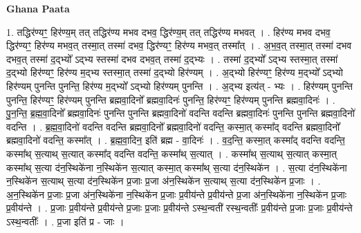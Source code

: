 \documentclass[17pt]{extarticle}
\begin{document}
\textbf{Ghana Paata } \newline

1. तद्धिर॑ण्यꣳ॒॒ हिर॑ण्य॒म् तत् तद्धिर॑ण्य मभव दभव॒ द्धिर॑ण्य॒म् तत् तद्धिर॑ण्य मभवत् । . हिर॑ण्य मभव दभव॒ द्धिर॑ण्यꣳ॒॒ हिर॑ण्य मभव॒त् तस्मा॒त् तस्मा॑ दभव॒ द्धिर॑ण्यꣳ॒॒ हिर॑ण्य मभव॒त् तस्मा᳚त् । . अ॒भ॒व॒त् तस्मा॒त् तस्मा॑ दभव दभव॒त् तस्मा॑ द॒द्भ्यो᳚ ऽद्भ्य स्तस्मा॑ दभव दभव॒त् तस्मा॑ द॒द्भ्यः । . तस्मा॑ द॒द्भ्यो᳚ ऽद्भ्य स्तस्मा॒त् तस्मा॑ द॒द्भ्यो हिर॑ण्यꣳ॒॒ हिर॑ण्य म॒द्भ्य स्तस्मा॒त् तस्मा॑ द॒द्भ्यो हिर॑ण्यम् । . अ॒द्भ्यो हिर॑ण्यꣳ॒॒ हिर॑ण्य म॒द्भ्यो᳚ ऽद्भ्यो हिर॑ण्यम् पुनन्ति पुनन्ति॒ हिर॑ण्य म॒द्भ्यो᳚ ऽद्भ्यो हिर॑ण्यम् पुनन्ति । . अ॒द्भ्य इत्य॑त् - भ्यः । . हिर॑ण्यम् पुनन्ति पुनन्ति॒ हिर॑ण्यꣳ॒॒ हिर॑ण्यम् पुनन्ति ब्रह्मवा॒दिनो᳚ ब्रह्मवा॒दिनः॑ पुनन्ति॒ हिर॑ण्यꣳ॒॒ हिर॑ण्यम् पुनन्ति ब्रह्मवा॒दिनः॑ । . पु॒न॒न्ति॒ ब्र॒ह्म॒वा॒दिनो᳚ ब्रह्मवा॒दिनः॑ पुनन्ति पुनन्ति ब्रह्मवा॒दिनो॑ वदन्ति वदन्ति ब्रह्मवा॒दिनः॑ पुनन्ति पुनन्ति ब्रह्मवा॒दिनो॑ वदन्ति । . ब्र॒ह्म॒वा॒दिनो॑ वदन्ति वदन्ति ब्रह्मवा॒दिनो᳚ ब्रह्मवा॒दिनो॑ वदन्ति॒ कस्मा॒त् कस्मा᳚द् वदन्ति ब्रह्मवा॒दिनो᳚ ब्रह्मवा॒दिनो॑ वदन्ति॒ कस्मा᳚त् । . ब्र॒ह्म॒वा॒दिन॒ इति॑ ब्रह्म - वा॒दिनः॑ । . व॒द॒न्ति॒ कस्मा॒त् कस्मा᳚द् वदन्ति वदन्ति॒ कस्मा᳚थ् स॒त्याथ् स॒त्यात् कस्मा᳚द् वदन्ति वदन्ति॒ कस्मा᳚थ् स॒त्यात् । . कस्मा᳚थ् स॒त्याथ् स॒त्यात् कस्मा॒त् कस्मा᳚थ् स॒त्या द॑न॒स्थिके॑ना न॒स्थिके॑न स॒त्यात् कस्मा॒त् कस्मा᳚थ् स॒त्या द॑न॒स्थिके॑न । . स॒त्या द॑न॒स्थिके॑ना न॒स्थिके॑न स॒त्याथ् स॒त्या द॑न॒स्थिके॑न प्र॒जाः प्र॒जा अ॑न॒स्थिके॑न स॒त्याथ् स॒त्या द॑न॒स्थिके॑न प्र॒जाः । . अ॒न॒स्थिके॑न प्र॒जाः प्र॒जा अ॑न॒स्थिके॑ना न॒स्थिके॑न प्र॒जाः प्र॒वीय॑न्ते प्र॒वीय॑न्ते प्र॒जा अ॑न॒स्थिके॑ना न॒स्थिके॑न प्र॒जाः प्र॒वीय॑न्ते । . प्र॒जाः प्र॒वीय॑न्ते प्र॒वीय॑न्ते प्र॒जाः प्र॒जाः प्र॒वीय॑न्ते ऽस्थ॒न्वती॑ रस्थ॒न्वतीः᳚ प्र॒वीय॑न्ते प्र॒जाः प्र॒जाः प्र॒वीय॑न्ते ऽस्थ॒न्वतीः᳚ । . प्र॒जा इति॑ प्र - जाः । \newline
\end{document}
